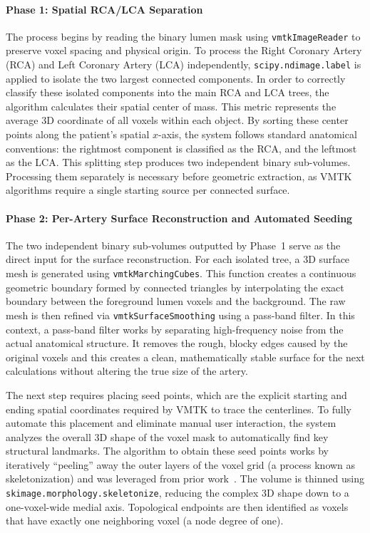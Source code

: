 \paragraph{Phase 1: Spatial RCA/LCA Separation}\mbox{}\par\vspace{0.5em}
The process begins by reading the binary lumen mask using \texttt{vmtkImageReader} to preserve voxel spacing and physical origin. To process the Right Coronary Artery (RCA) and Left Coronary Artery (LCA) independently, \texttt{scipy.ndimage.label} is applied to isolate the two largest connected components. In order to correctly classify these isolated components into the main RCA and LCA trees, the algorithm calculates their spatial center of mass. This metric represents the average 3D coordinate of all voxels within each object. By sorting these center points along the patient's spatial $x$-axis, the system follows standard anatomical conventions: the rightmost component is classified as the RCA, and the leftmost as the LCA. This splitting step produces two independent binary sub-volumes. Processing them separately is necessary before geometric extraction, as VMTK algorithms require a single starting source per connected surface.

\paragraph{Phase 2: Per-Artery Surface Reconstruction and Automated Seeding}\mbox{}\par\vspace{0.5em}
The two independent binary sub-volumes outputted by Phase~1 serve as the direct input for the surface reconstruction. For each isolated tree, a 3D surface mesh is generated using \texttt{vmtkMarchingCubes}. This function creates a continuous geometric boundary formed by connected triangles by interpolating the exact boundary between the foreground lumen voxels and the background. The raw mesh is then refined via \texttt{vmtkSurfaceSmoothing} using a pass-band filter. In this context, a pass-band filter works by separating high-frequency noise from the actual anatomical structure. It removes the rough, blocky edges caused by the original voxels and this creates a clean, mathematically stable surface for the next calculations without altering the true size of the artery.

The next step requires placing seed points, which are the explicit starting and ending spatial coordinates required by VMTK to trace the centerlines. To fully automate this placement and eliminate manual user interaction, the system analyzes the overall 3D shape of the voxel mask to automatically find key structural landmarks. The algorithm to obtain these seed points works by iteratively ``peeling'' away the outer layers of the voxel grid (a process known as skeletonization) and was leveraged from prior work~\cite{clapers2025}. The volume is thinned using \texttt{skimage.morphology.skeletonize}, reducing the complex 3D shape down to a one-voxel-wide medial axis. Topological endpoints are then identified as voxels that have exactly one neighboring voxel (a node degree of one).

